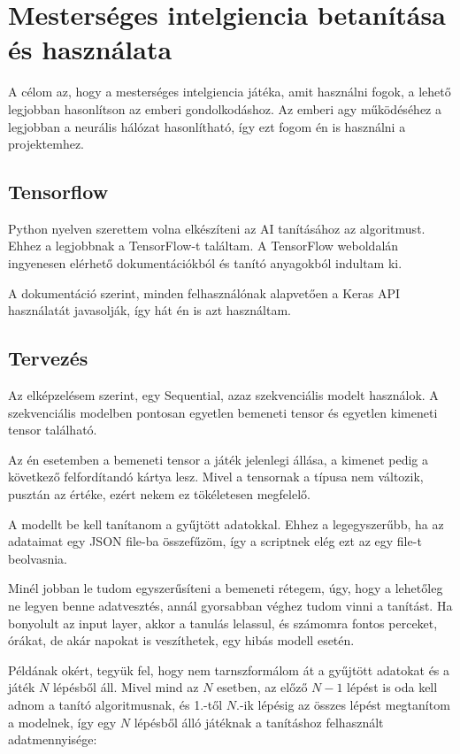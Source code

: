 \chapter{Mesterséges intelgiencia betanítása és használata}
\thispagestyle{fancy}
\pagestyle{fancy}


A célom az, hogy a mesterséges intelgiencia játéka, amit használni fogok, a lehető legjobban hasonlítson az emberi gondolkodáshoz. Az emberi agy működéséhez a legjobban 
a neurális hálózat hasonlítható, így ezt fogom én is használni a projektemhez. 



\section{Tensorflow}
Python nyelven szerettem volna elkészíteni az AI tanításához az algoritmust. Ehhez a legjobbnak a TensorFlow-t \cite{tensorflow2015-whitepaper} találtam. A TensorFlow weboldalán ingyenesen elérhető dokumentációkból és tanító anyagokból indultam ki. 

A dokumentáció szerint, minden felhasználónak alapvetően a Keras API használatát javasolják, így hát én is azt használtam. 

\section{Tervezés}
Az elképzelésem szerint, egy Sequential, azaz szekvenciális modelt használok. A szekvenciális modelben pontosan egyetlen bemeneti tensor és egyetlen kimeneti tensor található. 

Az én esetemben a bemeneti tensor a játék jelenlegi állása, a kimenet pedig a következő felfordítandó kártya lesz. Mivel a tensornak a típusa nem változik, pusztán az értéke, ezért nekem ez tökéletesen megfelelő. 

A modellt be kell tanítanom a gyűjtött adatokkal. Ehhez a legegyszerűbb, ha az adataimat egy JSON file-ba összefűzöm, így a scriptnek elég ezt az egy file-t beolvasnia. 

Minél jobban le tudom egyszerűsíteni a bemeneti rétegem, úgy, hogy a lehetőleg ne legyen benne adatvesztés, annál gyorsabban véghez tudom vinni a tanítást. 
Ha bonyolult az input layer, akkor a tanulás lelassul, és számomra fontos perceket, órákat, de akár napokat is veszíthetek, egy hibás modell esetén. 

Példának okért, tegyük fel, hogy nem tarnszformálom át a gyűjtött adatokat és a játék $N$ lépésből áll.
Mivel mind az $N$ esetben, az előző $N-1$ lépést is oda kell adnom a tanító algoritmusnak, és 1.-től $N.$-ik lépésig az összes lépést megtanítom a modelnek, így 
egy $N$ lépésből álló játéknak a tanításhoz felhasznált adatmennyisége:

